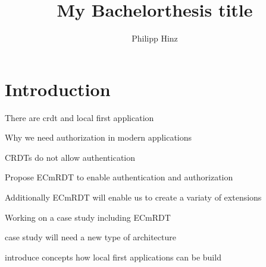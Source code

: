 \documentclass[
	ngerman,
	ruledheaders=section,   %
	class=report,		    %
	thesis={type=bachelor}, %
	accentcolor=9c,			%
	custommargins=true,    %
	marginpar=false,        %
	parskip=half-,          %
	fontsize=11pt,          %
]{tudapub}
\begin{document}

\title{My Bachelorthesis title}
\author[P. Hinz]{Philipp Hinz} %



\submissiondate{\today}
\examdate{\today}

\maketitle

\affidavit

\tableofcontents

\chapter{Introduction}
There are crdt and local first application

Why we need authorization in modern applications

CRDTs do not allow authentication

Propose ECmRDT to enable authentication and authorization

Additionally ECmRDT will enable us to create a variaty of extensions

Working on a case study including ECmRDT

case study will need a new type of architecture

introduce concepts how local first applications can be build
\end{document}
